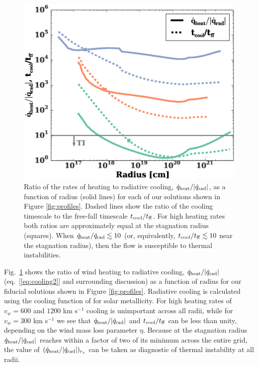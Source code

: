 \documentclass[usenatbib,fleqn]{mn2e}
\newcommand{\tcool}{t_{\rm cool}}
\newcommand{\tff}{t_{\rm ff}}
\begin{document}
\begin{figure}
  \includegraphics[width=\columnwidth]{cooling.eps}
  \caption{\label{fig:cooling} Ratio of the rates of heating to
radiative cooling, $\dot{q}_{\rm heat}/|\dot{q}_{\rm rad}|$, as a
function of radius (solid lines) for each of our solutions shown in
Figure \ref{fig:profiles}.  Dashed lines show the ratio
of the cooling timescale to the free-fall timescale $t_{\rm cool}/t_{\rm ff}$.
For high heating rates both ratios are approximately equal at the
stagnation radius (squares).  When $\dot{q}_{\rm
heat}/\dot{q}_{\rm rad} \lesssim 10$ (or, equivalently, $t_{\rm cool}/t_{\rm ff}
\lesssim 10$ near the stagnation radius), then the flow is susceptible to thermal instabilities.}
\end{figure}


Fig.~\ref{fig:cooling} shows the ratio of wind heating to radiative
cooling, $\dot{q}_{\rm heat}/|\dot{q}_{\rm rad}|$
(eq.~[\ref{eq:cooling2}] and surrounding discussion) as a function of
radius for our fiducial solutions shown in Figure \ref{fig:profiles}.
Radiative cooling is calculated using the cooling function of \citet{Draine:2011a} for solar metallicity.  For high heating rates of $v_{w} = 600$ and
$1200$ km s$^{-1}$ cooling is unimportant across all radii, while for
$v_{w} = 300$ km s$^{-1}$ we see that $\dot{q}_{\rm
  heat}/|\dot{q}_{\rm rad}|$ and $\tcool/\tff$ can be less than unity,
depending on the wind mass loss parameter $\eta$.  Because at the
stagnation radius $\dot{q}_{\rm heat}/|\dot{q}_{\rm rad}|$ reaches
within a factor of two of its minimum across the entire grid, the
value of $(\dot{q}_{\rm heat}/|\dot{q}_{\rm rad}|)_{r_{s}}$ can be
taken as diagnostic of thermal instability at all radii.
\end{document}
